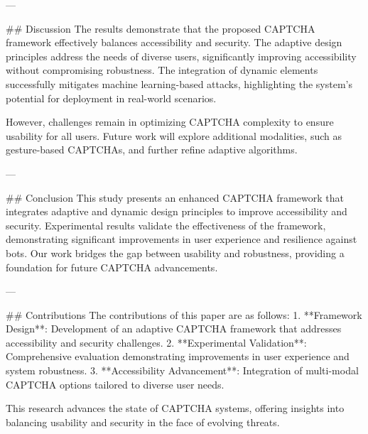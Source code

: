 ---

## Discussion
The results demonstrate that the proposed CAPTCHA framework effectively balances accessibility and security. The adaptive design principles address the needs of diverse users, significantly improving accessibility without compromising robustness. The integration of dynamic elements successfully mitigates machine learning-based attacks, highlighting the system's potential for deployment in real-world scenarios.

However, challenges remain in optimizing CAPTCHA complexity to ensure usability for all users. Future work will explore additional modalities, such as gesture-based CAPTCHAs, and further refine adaptive algorithms.

---

## Conclusion
This study presents an enhanced CAPTCHA framework that integrates adaptive and dynamic design principles to improve accessibility and security. Experimental results validate the effectiveness of the framework, demonstrating significant improvements in user experience and resilience against bots. Our work bridges the gap between usability and robustness, providing a foundation for future CAPTCHA advancements.

---

## Contributions
The contributions of this paper are as follows:
1. **Framework Design**: Development of an adaptive CAPTCHA framework that addresses accessibility and security challenges.
2. **Experimental Validation**: Comprehensive evaluation demonstrating improvements in user experience and system robustness.
3. **Accessibility Advancement**: Integration of multi-modal CAPTCHA options tailored to diverse user needs.

This research advances the state of CAPTCHA systems, offering insights into balancing usability and security in the face of evolving threats.